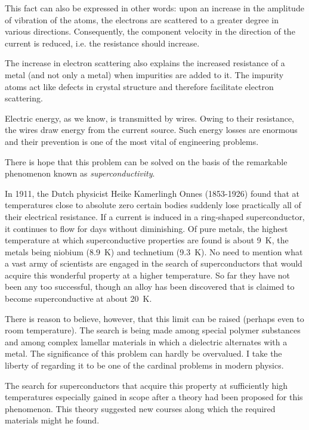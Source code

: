 This fact can also be expressed in other words: upon an increase in the amplitude of vibration of the atoms, the electrons are scattered to a greater degree in various directions. Consequently, the component velocity in the direction of the current is reduced, i.e. the resistance should increase.

The increase in electron scattering also explains the increased resistance of a metal (and not only a metal) when impurities are added to it. The impurity atoms act like defects in crystal structure and therefore facilitate electron scattering.

Electric energy, as we know, is transmitted by wires. Owing to their resistance, the wires draw energy from the current source. Such energy losses are enormous and their prevention is one of the most vital of engineering problems.

There is hope that this problem can be solved on the basis of the remarkable phenomenon known as \emph{superconductivity}.

In 1911, the Dutch physicist Heike Kamerlingh Onnes (1853-1926) found that at temperatures close to absolute zero certain bodies suddenly lose practically all of their electrical resistance. If a current is induced in a ring-shaped superconductor, it continues to flow for days without diminishing. Of pure metals, the highest temperature at which superconductive properties are found is about \SI{9}{\kelvin}, the metals being niobium (\SI{8.9}{\kelvin}) and technetium (\SI{9.3}{\kelvin}). No need to mention what a vast army of scientists are engaged in the search of superconductors that would acquire this wonderful property at a higher temperature. So far they have not been any too successful, though an alloy has been discovered that is claimed to become superconductive at about \SI{20}{\kelvin}.

There is reason to believe, however, that this limit can be raised (perhaps even to room temperature). The search is being made among special polymer substances and among complex lamellar materials in which a dielectric alternates with a metal. The significance of this problem can hardly be overvalued. I take the liberty of regarding it to be one of the cardinal problems in modern physics.

The search for superconductors that acquire this property at sufficiently high temperatures especially gained in scope after a theory had been proposed for this phenomenon. This theory suggested new courses along which the required materials might he found.

